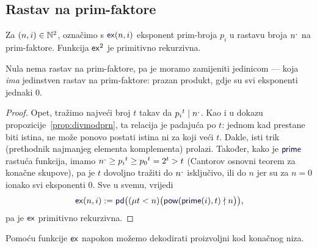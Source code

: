 \subsection{Rastav na prim-faktore}
\begin{lema}\label{lm:exprn}
Za $(n,i)\in{\mathbb N}^2$, označimo s $\f{ex}(n,i)$ eksponent prim-broja $p_i$ u rastavu broja $n\sp{\text{\normalsize.}}$ na prim-faktore. Funkcija $\f{ex}^2$ je primitivno rekurzivna.
\end{lema}
Nula nema rastav na prim-faktore, pa je moramo zamijeniti jedinicom --- koja \emph{ima} jedinstven rastav na prim-faktore: prazan produkt, gdje su svi eksponenti jednaki $0$.
\begin{proof}
Opet, tražimo najveći broj $t$ takav da ${p_i}^t\mid n\sp{\text{\normalsize.}}$. Kao i u dokazu propozicije~\ref{prop:divmodprn}, ta relacija je padajuća po $t$: jednom kad prestane biti istina, ne može ponovo postati istina ni za koji veći $t$. Dakle, isti trik (prethodnik najmanjeg elementa komplementa) prolazi. Također, kako je $\f{prime}$ rastuća funkcija, imamo $n\sp{\text{\normalsize.}}\ge{p_i}^t\ge{p_0}^t=2^t>t$ (Cantorov osnovni teorem za konačne skupove), pa je $t$ dovoljno tražiti do $n\sp{\text{\normalsize.}}$ isključivo, ili do $n$ jer su za $n=0$ ionako svi eksponenti $0$. Sve u svemu, vrijedi
\begin{equation}
    \f{ex}(n,i):=\f{pd}\bigl((\mu t<n)\bigl(\f{pow}(\f{prime}(i),t)\nmid n\bigr)\bigr)\text,
\end{equation}
pa je $\f{ex}$ primitivno rekurzivna.
\end{proof}

Pomoću funkcije $\f{ex}$ napokon možemo dekodirati proizvoljni kod konačnog niza.

